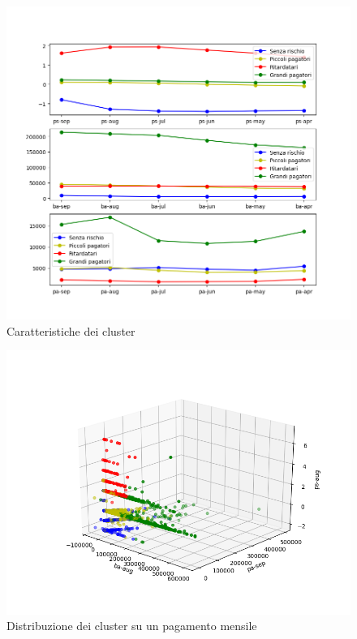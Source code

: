 \begin{figure}[H]
	\includegraphics[width=\linewidth]{img/centers_kmeans.png}
	\caption{Caratteristiche dei cluster}
	\label{fig:centers}
\end{figure} 

\begin{figure}[H]
\includegraphics[width=\linewidth]{img/kmeans.png}
\caption{Distribuzione dei cluster su un pagamento mensile}
\label{fig:kmeans}
\end{figure} 


